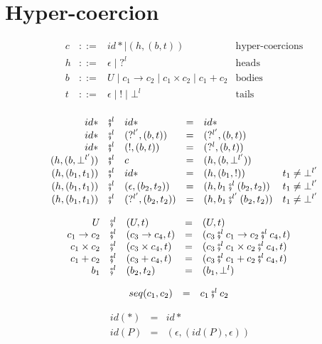 \documentclass[acmsmall,review,anonymous]{acmart}\settopmatter{printfolios=true,printccs=false,printacmref=false}
\newcommand{\stxrule}[3]{#1 & ::= & #3 & \text{#2}\\}
\newcommand{\funrule}[3]{#1 & = & #2 & #3\\}
\newcommand{\comprule}[4]{#1 & \fatsemi^l & #2 & = & #3 & #4 \\}
\newcommand{\plus}[0]{+}
\begin{document}
\section{Hyper-coercion} \label{sec:hyper-coercion}

\begin{figure}
	\[ 
	\begin{array}{lclr}
	\stxrule{c}{hyper-coercions}{
		id* \mid{}
		( h , ( b , t ) )
	}
	\stxrule{h}{heads}{
		\epsilon \mid{}
		?^l
	}
	\stxrule{b}{bodies}{
		U \mid{}
		c_1 \rightarrow c_2 \mid{}
		c_1 \times c_2 \mid{}
		c_1 \plus c_2
	}
	\stxrule{t}{tails}{
		\epsilon \mid{}
		! \mid{}
		\bot^l
	}
	\end{array}
	\]
	
	\[ 
	\begin{array}{rclclr}
	\comprule{id*}{id*}{
		id*
	}{}
	\comprule{id*}{( ?^{l'} , ( b , t ) )}{
		( ?^{l'} , ( b , t ) )
	}{}
	\comprule{id*}{( ! , ( b , t ) )}{
		(?^{l} , ( b , t))
	}{}
	\comprule{(h , (b ,\bot^{l'}))}{c}{
		(h , (b ,\bot^{l'}))
	}{}
	\comprule{(h , (b_1 , t_1))}{id*}{
		(h , (b_1 , !))
	}{t_1 \neq \bot^{l'}}
	\comprule{(h , (b_1 , t_1))}{(\epsilon , (b_2 , t_2))}{
		(h , b_1 \fatsemi^{l} (b_2 , t_2))
	}{t_1 \neq \bot^{l'}}
	\comprule{(h , (b_1 , t_1))}{(?^{l'} , (b_2 , t_2))}{
		(h , b_1 \fatsemi^{l'} (b_2 , t_2))
	}{t_1 \neq \bot^{l'}}
	\end{array}
	\]
	
	\[ 
	\begin{array}{rclclr}
	\comprule{U}{(U,t)}{
		(U,t)
	}{}
	\comprule{c_1 \rightarrow c_2}{(c_3 \rightarrow c_4,t)}{
		(c_3 \fatsemi^{l} c_1 \rightarrow c_2 \fatsemi^l c_4, t)
	}{}
	\comprule{c_1 \times c_2}{(c_3 \times c_4,t)}{
		(c_3 \fatsemi^{l} c_1 \times c_2 \fatsemi^l c_4, t)
	}{}
	\comprule{c_1 \plus c_2}{(c_3 \plus c_4,t)}{
		(c_3 \fatsemi^{l} c_1 \plus c_2 \fatsemi^l c_4, t)
	}{}
	\comprule{b_1}{(b_2,t_2)}{
		(b_1,\bot^l)
	}{}
	\end{array}
	\]
	
	\[
	\begin{array}{rclr}
	\funrule{seq(c_1,c_2)}{
		c_1 \fatsemi^l c_2
	}{}
	\end{array}
	\]
	
	\[
	\begin{array}{rclr}
	\funrule{id(*)}{
		id*
	}{}
	\funrule{id(P)}{
		(\epsilon,(id(P),\epsilon))
	}{}
	\end{array}
	\]
	

\end{figure}
\end{document}
